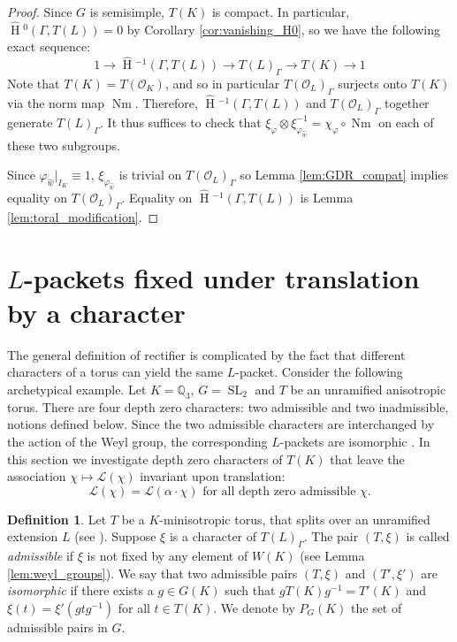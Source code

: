 \documentclass[11pt]{amsart}
\theoremstyle{plain}
\newcommand{\HT}[1]{\hat{\HH}{}^{#1}}
\theoremstyle{definition}
\newtheorem{definition}[theorem]{Definition}
\DeclareMathOperator{\HH}{H}
\DeclareMathOperator{\Nm}{Nm}
\DeclareMathOperator{\SL}{SL}
\newcommand{\OK}{\mathcal{O}_K}
\newcommand{\OL}{\mathcal{O}_L}
\newcommand{\QQ}{\mathbb{Q}}
\newcommand{\Lpack}{\mathcal{L}}
\begin{document}
\begin{proof}
Since $G$ is semisimple, $T(K)$ is compact.  In particular,
$\HT{0}(\Gamma, T(L)) = 0$ by Corollary \ref{cor:vanishing_H0},
so we have the following exact sequence:
$$1 \rightarrow \HT{-1}(\Gamma, T(L)) \rightarrow T(L)_{\Gamma} \rightarrow T(K) \rightarrow 1$$
Note that $T(K) = T(\OK)$, and so in particular
$T(\OL)_{\Gamma}$ surjects onto $T(K)$ via the norm map
$\Nm$.  Therefore, $\HT{-1}(\Gamma,T(L))$ and
$T(\OL)_{\Gamma}$ together generate $T(L)_{\Gamma}$.  It thus suffices to check that
$\xi_{\varphi} \otimes \xi_{\varphi_{\hat{w}}}^{-1} = \chi_{\varphi} \circ \Nm$
on each of these two subgroups.

Since $\varphi_{\hat{w}}|_{I_K} \equiv 1$, $\xi_{\varphi_{\hat{w}}}$ is trivial on
$T(\OL)_{\Gamma}$ so Lemma
\ref{lem:GDR_compat} implies equality on $T(\OL)_{\Gamma}$.
Equality on $\HT{-1}(\Gamma,T(L))$ is Lemma \ref{lem:toral_modification}.
\end{proof}

\section{$L$-packets fixed under translation by a character}\label{Q_T}

The general definition of rectifier is complicated by the fact that different
characters of a torus can yield the same $L$-packet.  Consider the following archetypical example.
Let $K = \QQ_3$, $G = \SL_2$ and $T$ be an unramified anisotropic torus.  There are four depth zero
characters: two admissible and two inadmissible, notions defined below.  Since the two admissible characters are interchanged
by the action of the Weyl group, the corresponding $L$-packets are isomorphic \cite[\S10]{murnaghan:11}.
In this section we investigate depth zero characters of $T(K)$ that leave the association $\chi \mapsto \Lpack(\chi)$ invariant upon translation:
$$\Lpack(\chi) = \Lpack(\alpha\cdot\chi) \mbox{ for all depth zero admissible $\chi$}.$$

\begin{definition} \label{def:admissible}
Let $T$ be a $K$-minisotropic torus, that splits over an unramified
extension $L$ (see \cite[\S3]{reeder:08a}).  Suppose $\xi$ is a character of $T(L)_{\Gamma}$.
The pair $(T, \xi)$ is called \emph{admissible} if $\xi$ is not fixed
by any element of $W(K)$ (see Lemma \ref{lem:weyl_groups}). We say that
two admissible pairs $(T, \xi)$ and $(T', \xi')$ are \emph{isomorphic} if there
exists a $g \in G(K)$ such that $gT(K)g^{-1} = T'(K)$ and $\xi(t) = \xi'(gtg^{-1})$
for all $t \in T(K)$.  We denote by $P_G(K)$ the set of admissible pairs in $G$.
\end{definition}
\end{document}
